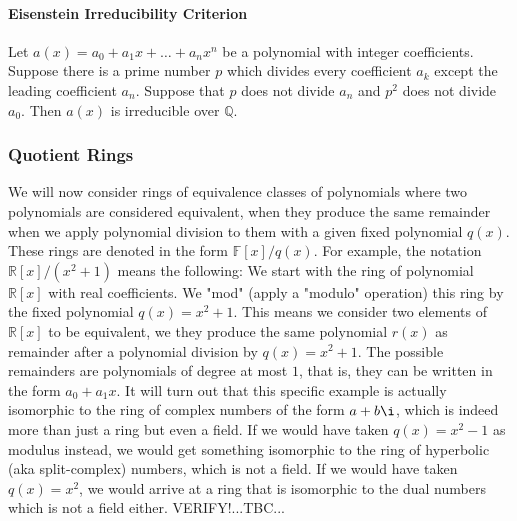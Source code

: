 

\paragraph{Eisenstein Irreducibility Criterion}
Let $a(x) = a_0 + a_1 x + \ldots + a_n x^n$ be a polynomial with integer coefficients. Suppose there is a prime number $p$ which divides every coefficient $a_k$ except the leading coefficient $a_n$. Suppose that $p$ does not divide $a_n$ and $p^2$ does not divide $a_0$. Then $a(x)$ is irreducible over $\mathbb{Q}$.




\subsubsection{Quotient Rings}
We will now consider rings of equivalence classes of polynomials where two polynomials are considered equivalent, when they produce the same remainder when we apply polynomial division to them with a given fixed polynomial $q(x)$. These rings are denoted in the form $\mathbb{F}[x] / q(x)$. For example, the notation $\mathbb{R}[x] / (x^2 + 1)$ means the following: We start with the ring of polynomial $\mathbb{R}[x]$ with real coefficients. We "mod" (apply a "modulo" operation) this ring by the fixed polynomial $q(x) = x^2 + 1$. This means we consider two elements of $\mathbb{R}[x]$ to be equivalent, we they produce the same polynomial $r(x)$ as remainder after a polynomial division by $q(x) = x^2 + 1$. The possible remainders are polynomials of degree at most $1$, that is, they can be written in the form $a_0 + a_1 x$. It will turn out that this specific example is actually isomorphic to the ring of complex numbers of the form $a + b \i$, which is indeed more than just a ring but even a field. If we would have taken $q(x) = x^2 - 1$ as modulus instead, we would get something isomorphic to the ring of hyperbolic (aka split-complex) numbers, which is not a field. If we would have taken $q(x) = x^2$, we would arrive at a ring that is isomorphic to the dual numbers which is not a field either.  VERIFY!...TBC...


